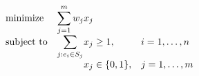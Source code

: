 \documentclass{article}
\begin{document}
	
$$
\begin{array}{ll@{}ll}
\text{minimize}  & \displaystyle\sum\limits_{j=1}^{m} w_{j}&x_{j} &\\
\text{subject to}& \displaystyle\sum\limits_{j:e_{i} \in S_{j}}   &x_{j} \geq 1,  &i=1 ,\dots, n\\
                 &                                                &x_{j} \in \{0,1\}, &j=1 ,\dots, m
\end{array}
$$
	
\end{document}
